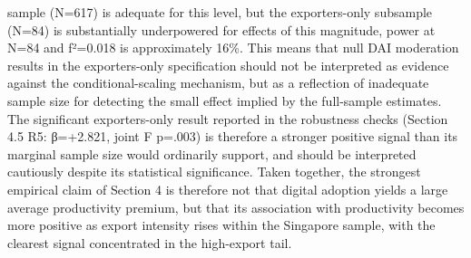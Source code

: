 \documentclass[12pt,a4paper]{article}
\begin{document}
sample (N=617) is adequate for this level, but the exporters-only
subsample (N=84) is substantially underpowered for effects of this
magnitude, power at N=84 and f²=0.018 is approximately 16\%. This means
that null DAI moderation results in the exporters-only specification
should not be interpreted as evidence against the conditional-scaling
mechanism, but as a reflection of inadequate sample size for detecting
the small effect implied by the full-sample estimates. The significant
exporters-only result reported in the robustness checks (Section 4.5 R5:
β=+2.821, joint F p=.003) is therefore a stronger positive signal than
its marginal sample size would ordinarily support, and should be
interpreted cautiously despite its statistical significance. Taken
together, the strongest empirical claim of Section 4 is therefore not
that digital adoption yields a large average productivity premium, but
that its association with productivity becomes more positive as export
intensity rises within the Singapore sample, with the clearest signal
concentrated in the high-export tail.
\end{document}
